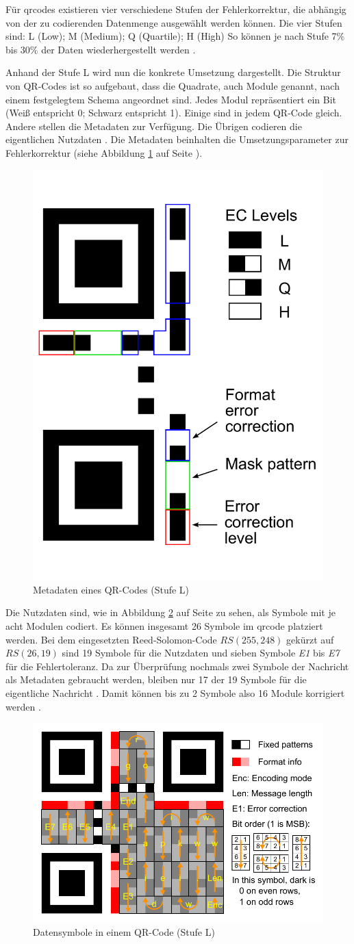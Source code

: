 Für \acrshort{qrcode}s existieren vier verschiedene Stufen der Fehlerkorrektur, die abhängig von der zu codierenden Datenmenge ausgewählt werden können. 
Die vier Stufen sind: L (Low); M (Medium); Q (Quartile); H (High)
So können je nach Stufe 7\% bis 30\% der Daten wiederhergestellt werden \cite[Kapitel 3]{tiwariIntroductionQRCode2016}.

Anhand der Stufe L wird nun die konkrete Umsetzung dargestellt.
Die Struktur von QR-Codes ist so aufgebaut, dass die Quadrate, auch Module genannt, nach einem festgelegtem Schema angeordnet sind.
Jedes Modul repräsentiert ein Bit (Weiß entspricht 0; Schwarz entspricht 1).
Einige sind in jedem QR-Code gleich. Andere stellen die Metadaten zur Verfügung.
Die Übrigen codieren die eigentlichen Nutzdaten \cite[Kapitel 3]{tiwariIntroductionQRCode2016}.
Die Metadaten beinhalten die Umsetzungsparameter zur Fehlerkorrektur (siehe Abbildung \ref{fig:qrschema} auf Seite \pageref{fig:qrschema}).
\begin{figure}[ht]
	\centering
	\includegraphics[height=0.4\textwidth]{figures/QR_Format_Information.pdf}
	\caption[Metadaten eines QR-Codes (Stufe L)]{Metadaten eines QR-Codes (Stufe L) \cite{QRCode2024}}
	\label{fig:qrschema}
\end{figure}
Die Nutzdaten sind, wie in Abbildung \ref{fig:qrdata} auf Seite \pageref{fig:qrdata} zu sehen, als Symbole mit je acht Modulen codiert.
Es können insgesamt 26 Symbole im \acrshort{qrcode} platziert werden.
Bei dem eingesetzten Reed-Solomon-Code $RS(255,248)$ gekürzt auf $RS(26,19)$ sind 19 Symbole für die Nutzdaten und sieben Symbole \textit{E1} bis \textit{E7} für die Fehlertoleranz.
Da zur Überprüfung nochmals zwei Symbole der Nachricht als Metadaten gebraucht werden, bleiben nur 17 der 19 Symbole für die eigentliche Nachricht \cite{pillazoHowDecodeQR2013}.
Damit können bis zu 2 Symbole also 16 Module korrigiert werden \cite{QRCode2024}.
\begin{figure}[ht]
	\centering
	\includegraphics[height=0.4\textwidth]{figures/QR_Character_Placement.pdf}
	\caption[Datensymbole in einem QR-Code (Stufe L)]{Datensymbole in einem QR-Code (Stufe L) \cite{QRCode2024}}
	\label{fig:qrdata}
\end{figure}


